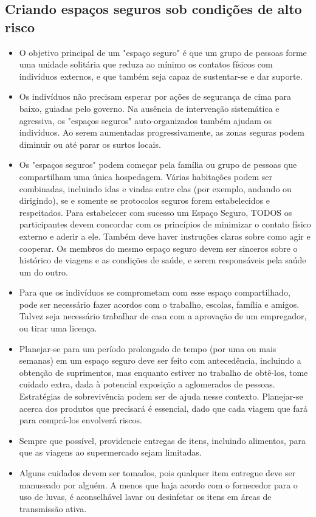 \documentclass[onecolumn,journal]{IEEEtran}
\begin{document}
\begin{multicols}{2}
\section*{Criando espaços seguros sob condições de alto risco}
\begin{itemize}

\item O objetivo principal de um "espaço seguro" é que um grupo de pessoas forme uma unidade solitária que reduza ao mínimo os contatos físicos com indivíduos externos, e que também seja capaz de sustentar-se e dar suporte.
\item Os indivíduos não precisam esperar por ações de segurança de cima para baixo, guiadas pelo governo. Na ausência de intervenção sistemática e agressiva, os "espaços seguros" auto-organizados também ajudam os indivíduos. Ao serem aumentadas progressivamente, as zonas seguras podem diminuir ou até parar os surtos locais.
\item Os "espaços seguros" podem começar pela família ou grupo de pessoas que compartilham uma única hospedagem. Várias habitações podem ser combinadas, incluindo idas e vindas entre elas (por exemplo, andando ou dirigindo), se e somente se protocolos seguros forem estabelecidos e respeitados. Para estabelecer com sucesso um Espaço Seguro, TODOS os participantes devem concordar com os princípios de minimizar o contato físico externo e aderir a ele. Também deve haver instruções claras sobre como agir e cooperar. Os membros do mesmo espaço seguro devem ser sinceros sobre o histórico de viagens e as condições de saúde, e serem responsáveis pela saúde um do outro.
\item Para que os indivíduos se comprometam com esse espaço compartilhado, pode ser necessário fazer acordos com o trabalho, escolas, família e amigos. Talvez seja necessário trabalhar de casa com a aprovação de um empregador, ou tirar uma licença.
\item Planejar-se para um período prolongado de tempo (por uma ou mais semanas) em um espaço seguro deve ser feito com antecedência, incluindo a obtenção de suprimentos, mas enquanto estiver no trabalho de obtê-los, tome cuidado extra, dada à potencial exposição a aglomerados de pessoas. Estratégias de sobrevivência podem ser de ajuda nesse contexto. Planejar-se acerca dos produtos que precisará é essencial, dado que cada viagem que fará para comprá-los envolverá riscos.
\item Sempre que possível, providencie entregas de itens, incluindo alimentos, para que as viagens ao supermercado sejam limitadas. \item Alguns cuidados devem ser tomados, pois qualquer item entregue deve ser manuseado por alguém. A menos que haja acordo com o fornecedor para o uso de luvas, é aconselhável lavar ou desinfetar os itens em áreas de transmissão ativa.

\end{itemize}
\end{multicols}
\end{document}
